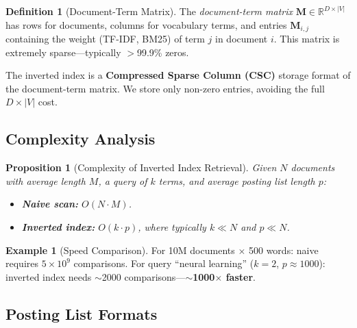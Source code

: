 \documentclass[11pt,a4paper]{article}
\theoremstyle{definition}
\newtheorem{definition}{Definition}[section]
\newtheorem{example}{Example}[section]
\theoremstyle{plain}
\newtheorem{proposition}{Proposition}[section]
\begin{document}
\begin{definition}[Document-Term Matrix]
\label{def:doc-term-matrix}
The \emph{document-term matrix} $\mathbf{M} \in \mathbb{R}^{D \times |V|}$ has rows for documents, columns for vocabulary terms, and entries $\mathbf{M}_{i,j}$ containing the weight (TF-IDF, BM25) of term $j$ in document $i$. This matrix is extremely sparse---typically $>$99.9\% zeros.
\end{definition}

\begin{center}

\end{center}

\begin{keytakeaway}
The inverted index is a \textbf{Compressed Sparse Column (CSC)} storage format of the document-term matrix. We store only non-zero entries, avoiding the full $D \times |V|$ cost.
\end{keytakeaway}

\subsection{Complexity Analysis}

\begin{proposition}[Complexity of Inverted Index Retrieval]
Given $N$ documents with average length $M$, a query of $k$ terms, and average posting list length $p$:
\begin{itemize}[nosep]
    \item \textbf{Naive scan:} $O(N \cdot M)$.
    \item \textbf{Inverted index:} $O(k \cdot p)$, where typically $k \ll N$ and $p \ll N$.
\end{itemize}
\end{proposition}

\begin{example}[Speed Comparison]
For 10M documents $\times$ 500 words: naive requires $5 \times 10^9$ comparisons. For query ``neural learning'' ($k=2$, $p \approx 1000$): inverted index needs $\sim$2000 comparisons---\textbf{$\sim$1000$\times$ faster}.
\end{example}

\subsection{Posting List Formats}
\end{document}
